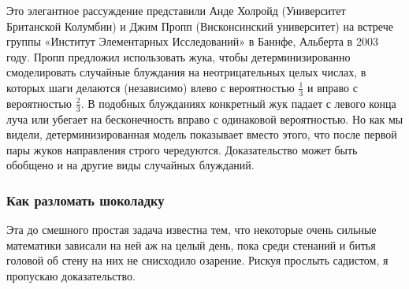 Это элегантное рассуждение представили
Анде Холройд (Университет Британской Колумбии) и Джим Пропп (Висконсинский университет) на встрече группы «Институт Элементарных Исследований» в Баннфе, Альберта в 2003 году.%
Пропп предложил использовать жука, чтобы детерминизированно смоделировать случайные блуждания на неотрицательных целых числах, в которых шаги делаются (независимо) влево с вероятностью $\tfrac13$ и вправо с вероятностью $\tfrac23$.
В подобных блужданиях конкретный жук падает с левого конца луча или убегает на бесконечность вправо с одинаковой вероятностью.
Но как мы видели, детерминизированная модель показывает вместо этого, что после первой пары жуков направления строго чередуются.
Доказательство может быть обобщено и на другие виды случайных блужданий.

\subsubsection*{Как разломать шоколадку}%

Эта до смешного простая задача известна тем, что некоторые очень сильные математики зависали на ней аж на целый день, пока среди стенаний и битья головой об стену на них не снисходило озарение.
Рискуя прослыть садистом, я пропускаю доказательство.
